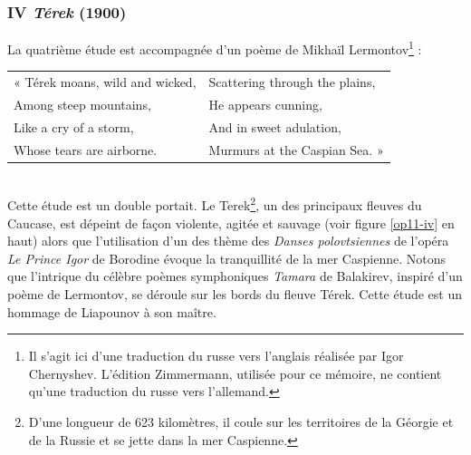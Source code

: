 \subsubsection{IV \emph{Térek} (1900)}

La quatrième étude est accompagnée d'un poème de Mikhaïl Lermontov\footnote{Il s'agit ici d'une traduction du russe vers l'anglais réalisée par Igor Chernyshev. L'édition Zimmermann, utilisée pour ce mémoire, ne contient qu'une traduction du russe vers l'allemand.} :\\

\begin{tabular}{ll}
\hspace{-3.9mm}« Térek moans, wild and wicked,
&
Scattering through the plains,
\\
Among steep mountains,
&
He appears cunning,
\\
Like a cry of a storm,
&
And in sweet adulation,
\\
Whose tears are airborne.
&
Murmurs at the Caspian Sea. »
\end{tabular}\\

Cette étude est un double portait. Le Terek\footnote{D'une longueur de 623 kilomètres, il coule sur les territoires de la Géorgie et de la Russie et se jette dans la mer Caspienne.}, un des principaux fleuves du Caucase, est dépeint de façon violente, agitée et sauvage (voir figure \ref{op11-iv} en haut) alors que l'utilisation d'un des thème des \emph{Danses polovtsiennes} de l'opéra \emph{Le Prince Igor} de Borodine évoque la tranquillité de la mer Caspienne. Notons que l'intrique du célèbre poèmes symphoniques \emph{Tamara} de Balakirev, inspiré d'un poème de Lermontov, se déroule sur les bords du fleuve Térek. Cette étude est un hommage de Liapounov à son maître.

